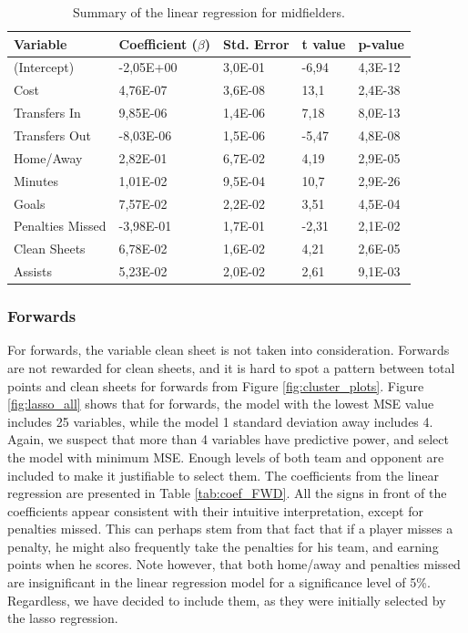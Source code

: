 \begin{table}[H]
\centering
\begin{tabular}{|l|l|l|l|l|}
\hline
Variable         & Coefficient ($\beta$)  & Std. Error & t value & p-value \\ \hline
(Intercept)      & -2,05E+00 & 3,0E-01    & -6,94   & 4,3E-12 \\
Cost             & 4,76E-07  & 3,6E-08    & 13,1   & 2,4E-38 \\
Transfers In     & 9,85E-06  & 1,4E-06    & 7,18    & 8,0E-13 \\
Transfers Out    & -8,03E-06 & 1,5E-06    & -5,47   & 4,8E-08 \\
Home/Away        & 2,82E-01  & 6,7E-02    & 4,19    & 2,9E-05 \\
Minutes          & 1,01E-02  & 9,5E-04    & 10,7   & 2,9E-26 \\
Goals            & 7,57E-02  & 2,2E-02    & 3,51    & 4,5E-04 \\
Penalties Missed & -3,98E-01 & 1,7E-01    & -2,31   & 2,1E-02 \\
Clean Sheets     & 6,78E-02  & 1,6E-02    & 4,21    & 2,6E-05 \\
Assists          & 5,23E-02  & 2,0E-02    & 2,61    & 9,1E-03 \\
\hline
\end{tabular}
\caption{Summary of the linear regression for midfielders.}
\label{tab:coef_MID}
\end{table}


\subsubsection{Forwards}
For forwards, the variable clean sheet is not taken into consideration. Forwards are not rewarded for clean sheets, and it is hard to spot a pattern between total points and clean sheets for forwards from Figure \ref{fig:cluster_plots}. Figure \ref{fig:lasso_all} shows that for forwards, the model with the lowest MSE value includes 25 variables, while the model 1 standard deviation away includes 4. Again, we suspect that more than 4 variables have predictive power, and select the model with minimum MSE. Enough levels of both team and opponent are included to make it justifiable to select them. The coefficients from the linear regression are presented in Table \ref{tab:coef_FWD}. All the signs in front of the coefficients appear consistent with their intuitive interpretation, except for penalties missed. This can perhaps stem from that fact that if a player misses a penalty, he might also frequently take the penalties for his team, and earning points when he scores. Note however, that both home/away and penalties missed are insignificant in the linear regression model for a significance level of 5\%. Regardless, we have decided to include them, as they were initially selected by the lasso regression.

